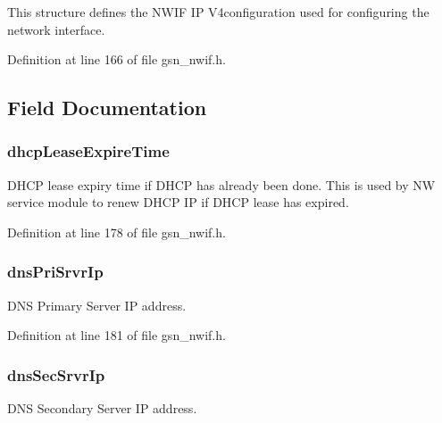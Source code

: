 This structure defines the NWIF IP V4configuration used for configuring the network interface. 

Definition at line 166 of file gsn\_\-nwif.h.



\subsection{Field Documentation}
\hypertarget{a00170_a89875aaf4ec4e96b54d0f7a14423861f}{
\subsubsection[{dhcpLeaseExpireTime}]{ {\bf dhcpLeaseExpireTime}}}
\label{a00170_a89875aaf4ec4e96b54d0f7a14423861f}
DHCP lease expiry time if DHCP has already been done. This is used by NW service module to renew DHCP IP if DHCP lease has expired. 

Definition at line 178 of file gsn\_\-nwif.h.

\hypertarget{a00170_a2e8867f6d4eeb9ec8e4e1f60b62256a6}{
\subsubsection[{dnsPriSrvrIp}]{ {\bf dnsPriSrvrIp}}}
\label{a00170_a2e8867f6d4eeb9ec8e4e1f60b62256a6}
DNS Primary Server IP address. 

Definition at line 181 of file gsn\_\-nwif.h.

\hypertarget{a00170_a671649f6f19fe92fefced076678b08ac}{
\subsubsection[{dnsSecSrvrIp}]{ {\bf dnsSecSrvrIp}}}
\label{a00170_a671649f6f19fe92fefced076678b08ac}
DNS Secondary Server IP address. 

